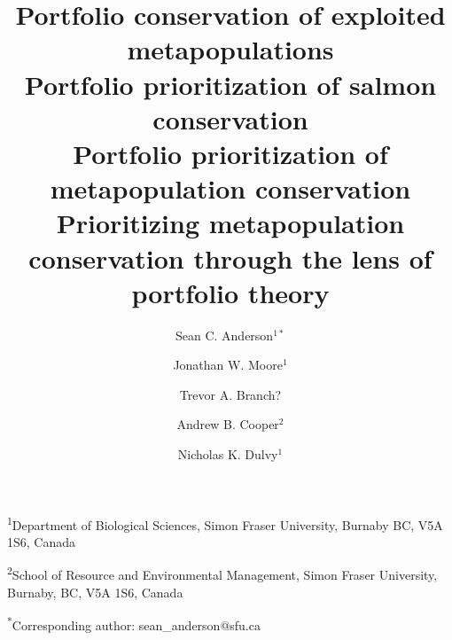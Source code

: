 \documentclass[12pt]{article}
\title{Portfolio conservation of exploited metapopulations\\Portfolio 
  prioritization of salmon conservation\\Portfolio prioritization of 
  metapopulation conservation\\Prioritizing metapopulation conservation through 
  the lens of portfolio theory}
\author{Sean C. Anderson$^{1*}$ \and Jonathan W. Moore$^1$ \and Trevor A. 
  Branch? \and Andrew B. Cooper$^2$ \and Nicholas K.  Dulvy$^1$}
\date{}
\begin{document}
\maketitle

\noindent
  \textsuperscript{1}Department of Biological Sciences, Simon Fraser
  University, Burnaby BC, V5A 1S6, Canada

\noindent
	\textsuperscript{2}School of Resource and Environmental Management, Simon
  Fraser University, Burnaby, BC, V5A 1S6, Canada

\noindent
	\textsuperscript{*}Corresponding author: sean\_anderson@sfu.ca

\clearpage




\renewcommand{\thetable}{S\arabic{table}}
\setcounter{table}{0} %

\renewcommand{\thefigure}{S\arabic{figure}}
\renewcommand{\figurename}{Fig.}
\setcounter{figure}{0}  %



\end{document}
